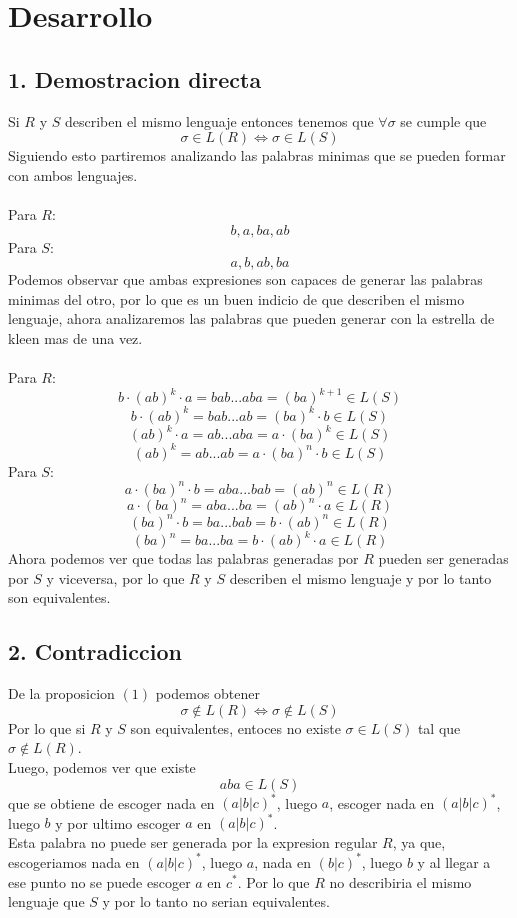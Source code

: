 \documentclass[spanish, draft]{article}
\begin{document}
\section*{Desarrollo}
	\subsection* {1. Demostracion directa}
      	Si $R$ y $S$ describen el mismo lenguaje entonces tenemos que $\forall \sigma$ se cumple que
        $$\sigma \in L(R) \iff \sigma \in L(S) \tag{1}$$
        Siguiendo esto partiremos analizando las palabras minimas que se pueden formar con ambos lenguajes.\\\\
        Para $R$:
        $$b , a, ba, ab$$
        Para $S$:
        $$a, b, ab, ba$$
        Podemos observar que ambas expresiones son capaces de generar las palabras minimas del otro, por lo que es un buen indicio de que describen el mismo lenguaje, ahora analizaremos las palabras que pueden generar con la estrella de kleen mas de una vez.\\\\
        Para $R$:
        $$b \cdot (ab)^k \cdot a = bab...aba = (ba)^{k+1} \in L(S)$$
        $$b \cdot (ab)^k = bab...ab = (ba)^k \cdot b \in L(S)$$
        $$(ab)^k \cdot a = ab...aba = a \cdot (ba)^k \in L(S)$$
        $$(ab)^k = ab...ab = a \cdot (ba)^n \cdot b \in L(S)$$
        Para $S$:
        $$a \cdot (ba)^n \cdot b = aba...bab = (ab)^n \in L(R)$$
        $$a \cdot (ba)^n = aba...ba = (ab)^n \cdot a \in L(R)$$
        $$(ba)^n \cdot b = ba...bab = b \cdot (ab)^n \in L(R)$$
        $$(ba)^n = ba...ba = b \cdot (ab)^k \cdot a \in L(R)$$
      Ahora podemos ver que todas las palabras generadas por $R$ pueden ser generadas por $S$ y viceversa, por lo que $R$ y $S$ describen el mismo lenguaje y por lo tanto son equivalentes.


	\subsection* {2. Contradiccion}
    	De la proposicion $(1)$ podemos obtener
        $$\sigma \notin L(R) \iff \sigma \notin L(S) \tag{2}$$
        Por lo que si $R$ y $S$ son equivalentes, entoces no existe $\sigma \in L(S)$ tal que $\sigma \notin L(R)$.\\
        Luego, podemos ver que existe
        $$aba \in L(S)$$
        que se obtiene de escoger nada en $(a|b|c)^*$, luego $a$, escoger nada en $(a|b|c)^*$, luego $b$ y por ultimo escoger $a$ en $(a|b|c)^*$.\\
        Esta palabra no puede ser generada por la expresion regular $R$, ya que, escogeriamos nada en $(a|b|c)^*$, luego $a$, nada en $(b|c)^*$, luego $b$ y al llegar a ese punto no se puede escoger $a$ en $c^*$. Por lo que $R$ no describiria el mismo lenguaje que $S$ y por lo tanto no serian equivalentes.
        
\end{document}
